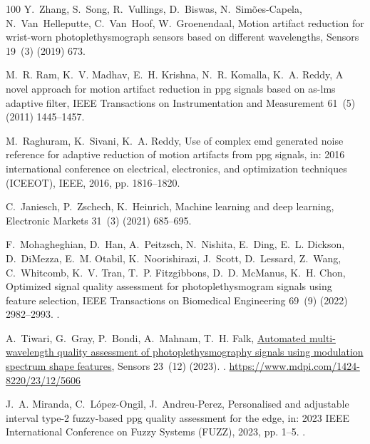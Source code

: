 \documentclass[final,3p,times,twocolumn]{elsarticle}
\begin{document}
\begin{thebibliography}{100}
Y.~Zhang, S.~Song, R.~Vullings, D.~Biswas, N.~Sim{\~o}es-Capela,
  N.~Van~Helleputte, C.~Van~Hoof, W.~Groenendaal, Motion artifact reduction for
  wrist-worn photoplethysmograph sensors based on different wavelengths,
  Sensors 19~(3) (2019) 673.

M.~R. Ram, K.~V. Madhav, E.~H. Krishna, N.~R. Komalla, K.~A. Reddy, A novel
  approach for motion artifact reduction in ppg signals based on as-lms
  adaptive filter, IEEE Transactions on Instrumentation and Measurement 61~(5)
  (2011) 1445--1457.

M.~Raghuram, K.~Sivani, K.~A. Reddy, Use of complex emd generated noise
  reference for adaptive reduction of motion artifacts from ppg signals, in:
  2016 international conference on electrical, electronics, and optimization
  techniques (ICEEOT), IEEE, 2016, pp. 1816--1820.

C.~Janiesch, P.~Zschech, K.~Heinrich, Machine learning and deep learning,
  Electronic Markets 31~(3) (2021) 685--695.

F.~Mohagheghian, D.~Han, A.~Peitzsch, N.~Nishita, E.~Ding, E.~L. Dickson,
  D.~DiMezza, E.~M. Otabil, K.~Noorishirazi, J.~Scott, D.~Lessard, Z.~Wang,
  C.~Whitcomb, K.~V. Tran, T.~P. Fitzgibbons, D.~D. McManus, K.~H. Chon,
  Optimized signal quality assessment for photoplethysmogram signals using
  feature selection, IEEE Transactions on Biomedical Engineering 69~(9) (2022)
  2982--2993.
\newblock \href {https://doi.org/10.1109/TBME.2022.3158582}
  {}.

A.~Tiwari, G.~Gray, P.~Bondi, A.~Mahnam, T.~H. Falk,
  \href{https://www.mdpi.com/1424-8220/23/12/5606}{Automated multi-wavelength
  quality assessment of photoplethysmography signals using modulation spectrum
  shape features}, Sensors 23~(12) (2023).
\newblock \href {https://doi.org/10.3390/s23125606}
  {}.
\newline\urlprefix\url{https://www.mdpi.com/1424-8220/23/12/5606}

J.~A. Miranda, C.~López-Ongil, J.~Andreu-Perez, Personalised and adjustable
  interval type-2 fuzzy-based ppg quality assessment for the edge, in: 2023
  IEEE International Conference on Fuzzy Systems (FUZZ), 2023, pp. 1--5.
\newblock \href {https://doi.org/10.1109/FUZZ52849.2023.10309733}
  {}.


\end{thebibliography}
\end{document}
